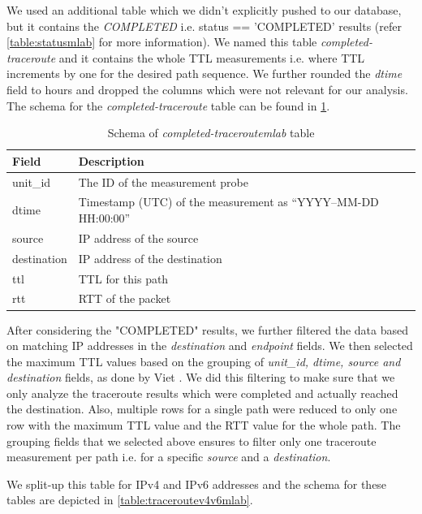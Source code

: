 We used an additional table which we didn't explicitly pushed to our database, but it contains the \textit{COMPLETED} i.e. status == 'COMPLETED' results (refer \cref{table:statusmlab} for more information). We named this table \textit{completed-traceroute} and it contains the whole TTL measurements i.e. where TTL increments by one for the desired path sequence. We further rounded the \textit{dtime} field to hours and dropped the columns which were not relevant for our analysis. The schema for the \textit{completed-traceroute} table can be found in \cref{table:completedmlab}. 

\begin{table}[!h]
	\centering
	\caption{Schema of \textit{completed-traceroutemlab} table}
	\label{table:completedmlab}
	\begin{tabular}{lp{8cm}}
  		\toprule
  		\textbf{Field} & \textbf{Description} \\ 
  		\midrule
  		unit\_id & The ID of the measurement probe \\ 
  		dtime & Timestamp (UTC) of the measurement as “YYYY–MM-DD HH:00:00” \\  
		source &  IP address of the source \\ 
		destination & IP address of the destination \\   
		ttl & TTL for this path \\ 
		rtt & RTT of the packet \\
  		\bottomrule
\end{tabular}
\end{table}

\FloatBarrier

After considering the "COMPLETED" results, we further filtered the data based on matching IP addresses in the \textit{destination} and \textit{endpoint} fields. We then selected the maximum TTL values based on the grouping of \textit{unit\_id, dtime, source and destination} fields, as done by Viet \cite{viet}. We did this filtering to make sure that we only analyze the traceroute results which were completed and actually reached the destination. Also, multiple rows for a single path were reduced to only one row with the maximum TTL value and the RTT value for the whole path. The grouping fields that we selected above ensures to filter only one traceroute measurement per path i.e. for a specific \textit{source} and a \textit{destination}. 

We split-up this table for IPv4 and IPv6 addresses and the schema for these tables are depicted in \cref{table:traceroutev4v6mlab}.

